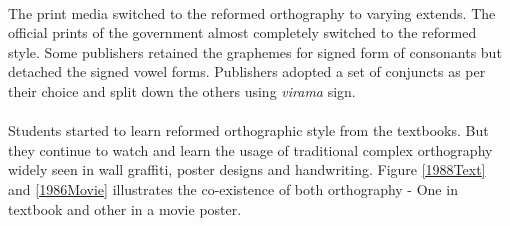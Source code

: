 \documentclass[10pt]{article}
\begin{document}
\paragraph{}
The print media switched to the reformed orthography to varying extends. The official prints of the government almost completely switched to the reformed style. Some publishers retained the graphemes for signed form of consonants but detached the signed vowel forms. Publishers adopted a set of conjuncts as per their choice and split down the others using \textit{virama} sign.
\paragraph{}
Students started to learn reformed orthographic style from the textbooks. But they continue to watch and learn the usage of traditional complex orthography widely seen in wall graffiti, poster designs and handwriting. Figure \ref{1988Text} and \ref{1986Movie} illustrates the co-existence of both orthography - One in textbook and other in a movie poster.
\end{document}
